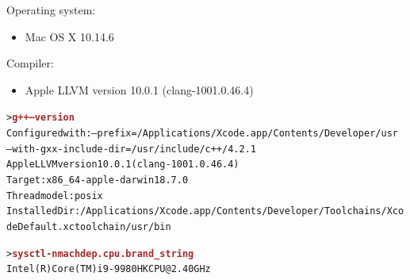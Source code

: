 \documentclass[10pt]{article}
\begin{document}
Operating system:
\begin{itemize}
\item Mac OS X 10.14.6
\end{itemize}

Compiler:
\begin{itemize}
\item Apple LLVM version 10.0.1 (clang-1001.0.46.4)
\end{itemize}

\begin{alltt}
\footnotesize
> \textbf{\textcolor{brown}{g++ --version}}
Configured with: --prefix=/Applications/Xcode.app/Contents/Developer/usr
                 --with-gxx-include-dir=/usr/include/c++/4.2.1
Apple LLVM version 10.0.1 (clang-1001.0.46.4)
Target: x86_64-apple-darwin18.7.0
Thread model: posix
InstalledDir: /Applications/Xcode.app/Contents/Developer/Toolchains/XcodeDefault.xctoolchain/usr/bin

> \textbf{\textcolor{brown}{sysctl -n machdep.cpu.brand_string}}
Intel(R) Core(TM) i9-9980HK CPU @ 2.40GHz
\end{alltt}
\end{document}
